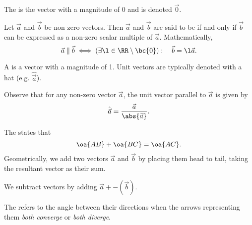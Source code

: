 \begin{definition}
    The  is the vector with a magnitude of 0 and is denoted $\vec 0$.
\end{definition}

\begin{definition}
    Let $\vec a$ and $\vec b$ be non-zero vectors. Then $\vec a$ and $\vec b$ are said to be  if and only if $\vec b$ can be expressed as a non-zero scalar multiple of $\vec a$. Mathematically, \[\vec a \parallel \vec b \iff (\exists \l \in \RR \setminus \bc{0}): \quad \vec b = \l \vec a.\]
\end{definition}

\begin{definition}
    A  is a vector with a magnitude of 1. Unit vectors are typically denoted with a hat (e.g. $\hat{\vec a}$).
\end{definition}
Observe that for any non-zero vector $\vec a$, the unit vector parallel to $\vec a$ is given by \[\hat{\vec a} = \frac{\vec a}{\abs{\vec a}}.\]

\begin{definition}
    The  states that \[\oa{AB} + \oa{BC} = \oa{AC}.\] Geometrically, we add two vectors $\vec a$ and $\vec b$ by placing them head to tail, taking the resultant vector as their sum.

    \begin{center}
    \end{center}

    We subtract vectors by adding $\vec a + -(\vec b)$.
\end{definition}

\begin{definition}
    The  refers to the angle between their directions when the arrows representing them \textit{both converge} or \textit{both diverge}.
\end{definition}

